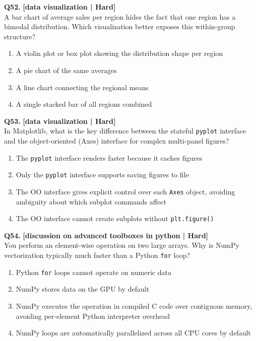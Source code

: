 \noindent\textbf{Q52.} \hfill {\small\color{LPUOrange}\textbf{[data visualization | Hard]}}\\[2pt]
A bar chart of average sales per region hides the fact that one region has a bimodal distribution. Which visualization better exposes this within-group structure?

\begin{enumerate}[label=(\alph*),topsep=2pt,itemsep=1pt,partopsep=0pt,parsep=0pt]
    \item \relax A violin plot or box plot showing the distribution shape per region
    \item \relax A pie chart of the same averages
    \item \relax A line chart connecting the regional means
    \item \relax A single stacked bar of all regions combined
\end{enumerate}
\vspace{2mm}

\noindent\textbf{Q53.} \hfill {\small\color{LPUOrange}\textbf{[data visualization | Hard]}}\\[2pt]
In Matplotlib, what is the key difference between the stateful \texttt{pyplot} interface and the object-oriented (Axes) interface for complex multi-panel figures?

\begin{enumerate}[label=(\alph*),topsep=2pt,itemsep=1pt,partopsep=0pt,parsep=0pt]
    \item \relax The \texttt{pyplot} interface renders faster because it caches figures
    \item \relax Only the \texttt{pyplot} interface supports saving figures to file
    \item \relax The OO interface gives explicit control over each \texttt{Axes} object, avoiding ambiguity about which subplot commands affect
    \item \relax The OO interface cannot create subplots without \texttt{plt.figure()}
\end{enumerate}
\vspace{2mm}

\noindent\textbf{Q54.} \hfill {\small\color{LPUOrange}\textbf{[discussion on advanced toolboxes in python | Hard]}}\\[2pt]
You perform an element-wise operation on two large arrays. Why is NumPy vectorization typically much faster than a Python \texttt{for} loop?

\begin{enumerate}[label=(\alph*),topsep=2pt,itemsep=1pt,partopsep=0pt,parsep=0pt]
    \item \relax Python \texttt{for} loops cannot operate on numeric data
    \item \relax NumPy stores data on the GPU by default
    \item \relax NumPy executes the operation in compiled C code over contiguous memory, avoiding per-element Python interpreter overhead
    \item \relax NumPy loops are automatically parallelized across all CPU cores by default
\end{enumerate}
\vspace{2mm}

